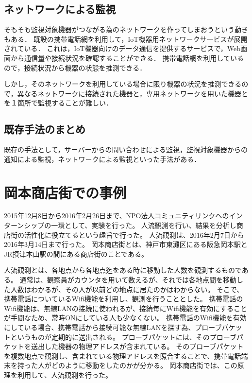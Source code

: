 \subsection{ネットワークによる監視}
	そもそも監視対象機器がつながる為のネットワークを作ってしまおうという動きもある．
	既設の携帯電話網を利用して，IoT機器用ネットワークサービスが展開されている．
	これは，IoT機器向けのデータ通信を提供するサービスで，Web画面から通信量や接続状況を確認することができる．
	携帯電話網を利用しているので，接続状況から機器の状態を推測できる．

	しかし，そのネットワークを利用している場合に限り機器の状況を推測できるので，異なるネットワークに接続された機器と，専用ネットワークを用いた機器とを１箇所で監視することが難しい．

\subsection{既存手法のまとめ}
	既存の手法として，サーバーからの問い合わせによる監視，監視対象機器からの通知による監視，ネットワークによる監視といった手法がある．







\section{岡本商店街での事例}
2015年12月8日から2016年2月26日まで、NPO法人コミュニティリンクへのインターンシップの一環として、実験を行った。
人流観測を行い、結果を分析し商店街の活性化に役立てるという趣旨で行った。
人流観測は、2016年2月7日から2016年3月14日まで行った。
岡本商店街とは、神戸市東灘区にある阪急岡本駅とJR摂津本山駅の間にある商店街のことである。

人流観測とは、各地点から各地点迄をある時に移動した人数を観測するものである。
通常は、観察員がカウンタを用いて数えるが、それでは各地点間を移動した人数はわかるが、その人が以前どの地点に居たのかはわからない。
そこで、携帯電話についているWifi機能を利用し、観測を行うこととした。
携帯電話のWifi機能は、無線LANの接続に使われるが、接続毎にWifi機能を有効にすることが手間なため、常時ONにしている人も少なくない。
携帯電話のWifi機能を有効にしている場合、携帯電話から接続可能な無線LANを探す為、プローブパケットというものが定期的に送出される。
プローブパケットには、そのプローブパケットを送出した機器の物理アドレスが含まれている。
そのプローブパケットを複数地点で観測し、含まれている物理アドレスを照合することで、携帯電話端末を持った人がどのように移動をしたのかが分かる。
岡本商店街では、この原理を利用して、人流観測を行った。

